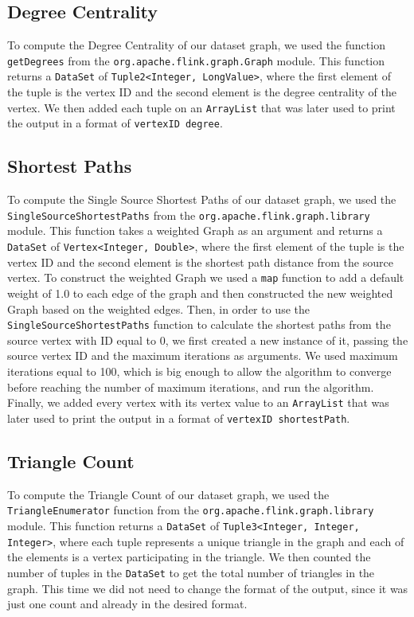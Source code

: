 \documentclass[conference]{IEEEtran}
\begin{document}
\subsection{Degree Centrality}

To compute the Degree Centrality of our dataset graph, we used the function \verb|getDegrees| from the \verb|org.apache.flink.graph.Graph| module. This function returns a \verb|DataSet| of \verb|Tuple2<Integer, LongValue>|, where the first element of the tuple is the vertex ID and the second element is the degree centrality of the vertex. We then added each tuple on an \verb|ArrayList| that was later used to print the output in a format of \verb|vertexID degree|.

\subsection{Shortest Paths}

To compute the Single Source Shortest Paths of our dataset graph, we used the \verb|SingleSourceShortestPaths| from the \verb|org.apache.flink.graph.library| module. This function takes a weighted Graph as an argument and returns a \verb|DataSet| of \verb|Vertex<Integer, Double>|, where the first element of the tuple is the vertex ID and the second element is the shortest path distance from the source vertex. To construct the weighted Graph we used a \verb|map| function to add a default weight of 1.0 to each edge of the graph and then constructed the new weighted Graph based on the weighted edges. Then, in order to use the \verb|SingleSourceShortestPaths| function to calculate the shortest paths from the source vertex with ID equal to 0, we first created a new instance of it, passing the source vertex ID and the maximum iterations as arguments. We used maximum iterations equal to 100, which is big enough to allow the algorithm to converge before reaching the number of maximum iterations, and run the algorithm. Finally, we added every vertex with its vertex value to an \verb|ArrayList| that was later used to print the output in a format of \verb|vertexID shortestPath|.

\subsection{Triangle Count}

To compute the Triangle Count of our dataset graph, we used the \verb|TriangleEnumerator| function from the \verb|org.apache.flink.graph.library| module. This function returns a \verb|DataSet| of \verb|Tuple3<Integer, Integer, Integer>|, where each tuple represents a unique triangle in the graph and each of the elements is a vertex participating in the triangle. We then counted the number of tuples in the \verb|DataSet| to get the total number of triangles in the graph. This time we did not need to change the format of the output, since it was just one count and already in the desired format.
\end{document}
